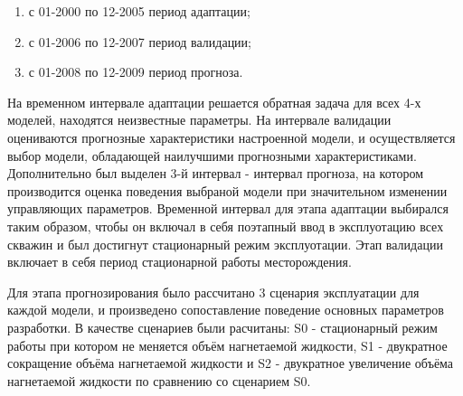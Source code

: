 \documentclass{article}
\begin{document}
\begin{enumerate}
\item с 01-2000 по 12-2005  период адаптации;
\item с 01-2006 по 12-2007  период валидации;
\item с 01-2008 по 12-2009  период прогноза.
\end{enumerate}
На временном интервале адаптации решается обратная задача для всех 4-х моделей, находятся неизвестные параметры. На интервале валидации оцениваются прогнозные характеристики настроенной модели, и осуществляется выбор модели, обладающей наилучшими прогнозными характеристиками. Дополнительно был выделен 3-й интервал - интервал прогноза, на котором производится оценка поведения выбраной модели при значительном изменении управляющих параметров. Временной интервал для этапа адаптации выбирался таким образом, чтобы он включал в себя поэтапный ввод в эксплуотацию всех скважин и был достигнут стационарный режим эксплуотации. Этап валидации включает в себя период стационарной работы месторождения. 

Для этапа прогнозирования было рассчитано 3 сценария эксплуатации для каждой модели, и произведено сопоставление поведение основных параметров разработки. В качестве сценариев были расчитаны: S0 - стационарный режим работы при котором не меняется объём нагнетаемой жидкости, S1 - двукратное сокращение объёма нагнетаемой жидкости и S2 - двукратное увеличение объёма нагнетаемой жидкости по сравнению со сценарием S0. 
\end{document}
